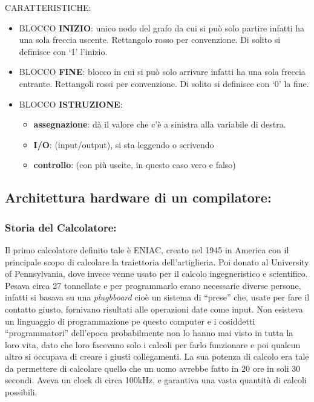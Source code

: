 \documentclass[
  paper=a4,
  oneside  ,captions=tableheading
]{scrbook}
\providecommand{\tightlist}{%
  \setlength{\itemsep}{0pt}\setlength{\parskip}{0pt}}
\begin{document}
CARATTERISTICHE:

\begin{itemize}
\tightlist
\item
  BLOCCO \textbf{INIZIO}: unico nodo del grafo da cui si può solo
  partire infatti ha una sola freccia uscente. Rettangolo rosso per
  convenzione. Di solito si definisce con `1' l'inizio.
\item
  BLOCCO \textbf{FINE}: blocco in cui si può solo arrivare infatti ha
  una sola freccia entrante. Rettangoli rossi per convenzione. Di solito
  si definisce con `0' la fine.
\item
  BLOCCO \textbf{ISTRUZIONE}:

  \begin{itemize}
  \tightlist
  \item
    \textbf{assegnazione}: dà il valore che c'è a sinistra alla
    variabile di destra.
  \item
    \textbf{I/O}: (input/output), si sta leggendo o scrivendo
  \item
    \textbf{controllo}: (con più uscite, in questo caso vero e falso)
  \end{itemize}
\end{itemize}

\hypertarget{architettura-hardware-di-un-compilatore}{%
\subsection{Architettura hardware di un
compilatore:}\label{architettura-hardware-di-un-compilatore}}

\hypertarget{storia-del-calcolatore}{%
\subsubsection{Storia del Calcolatore:}\label{storia-del-calcolatore}}

Il primo calcolatore definito tale è ENIAC, creato nel 1945 in America
con il principale scopo di calcolare la traiettoria dell'artiglieria.
Poi donato al University of Pennsylvania, dove invece venne usato per il
calcolo ingegneristico e scientifico. Pesava circa 27 tonnellate e per
programmarlo erano necessarie diverse persone, infatti si basava su una
\emph{plugbboard} cioè un sistema di ``prese'' che, usate per fare il
contatto giusto, fornivano risultati alle operazioni date come input.
Non esisteva un linguaggio di programmazione pe questo computer e i
cosiddetti ``programmatori'' dell'epoca probabilmente non lo hanno mai
visto in tutta la loro vita, dato che loro facevano solo i calcoli per
farlo funzionare e poi qualcun altro si occupava di creare i giusti
collegamenti. La sua potenza di calcolo era tale da permettere di
calcolare quello che un uomo avrebbe fatto in 20 ore in soli 30 secondi.
Aveva un clock di circa 100kHz, e garantiva una vasta quantità di
calcoli possibili.
\end{document}
